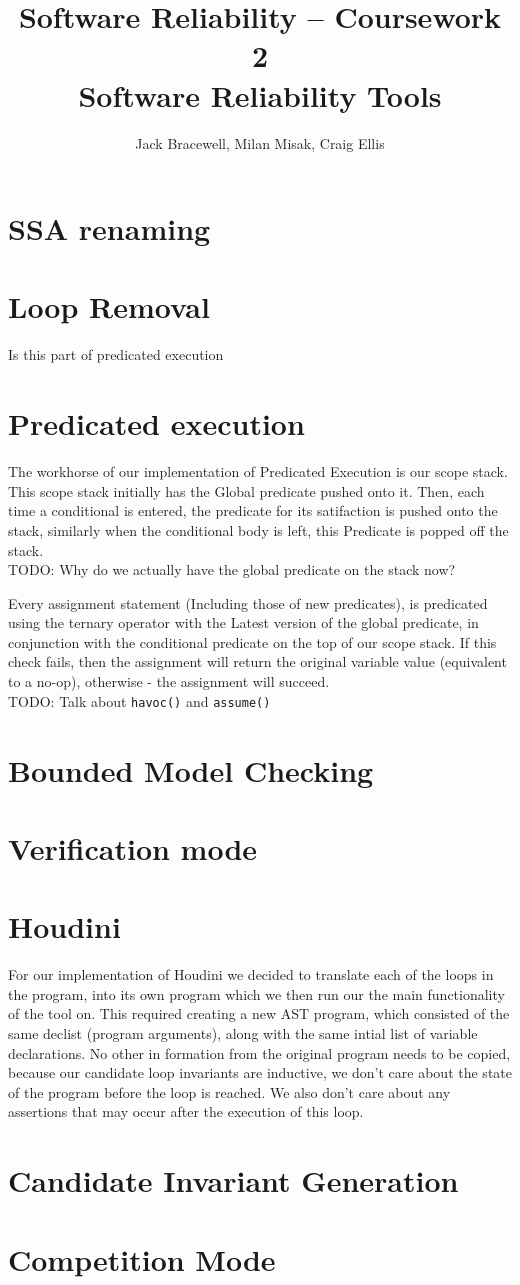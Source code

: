\documentclass[11pt]{article}
\title{Software Reliability -- Coursework 2 \\ Software Reliability Tools}
\author{Jack Bracewell, Milan Misak, Craig Ellis}
\date{}
\begin{document}
\maketitle

\section{SSA renaming}
\section{Loop Removal}
Is this part of predicated execution
\section{Predicated execution}
The workhorse of our implementation of Predicated Execution is our scope stack. This scope stack initially
has the Global predicate pushed onto it. Then, each time a conditional is entered, the predicate for its
satifaction is pushed onto the stack, similarly when the conditional body is left, this Predicate is
popped off the stack.\\

TODO: Why do we actually have the global predicate on the stack now?

Every assignment statement (Including those of new predicates), is predicated using the ternary operator
with the Latest version of the global predicate, in conjunction with the conditional predicate on the
top of our scope stack. If this check fails, then the assignment will return the original variable value
(equivalent to a no-op), otherwise - the assignment will succeed. \\

TODO: Talk about \verb|havoc()| and \verb|assume()|

\section{Bounded Model Checking}
\section{Verification mode}
\section{Houdini}

For our implementation of Houdini we decided to translate each of the loops in the program, into its own
program which we then run our the main functionality of the tool on. This required creating a new AST
program, which consisted of the same declist (program arguments), along with the same intial list of
variable declarations. No other in formation from the original program needs to be copied, because our
candidate loop invariants are inductive, we don't care about the state of the program before the loop
is reached. We also don't care about any assertions that may occur after the execution of this loop.
\section{Candidate Invariant Generation}
\section{Competition Mode}
\end{document}

